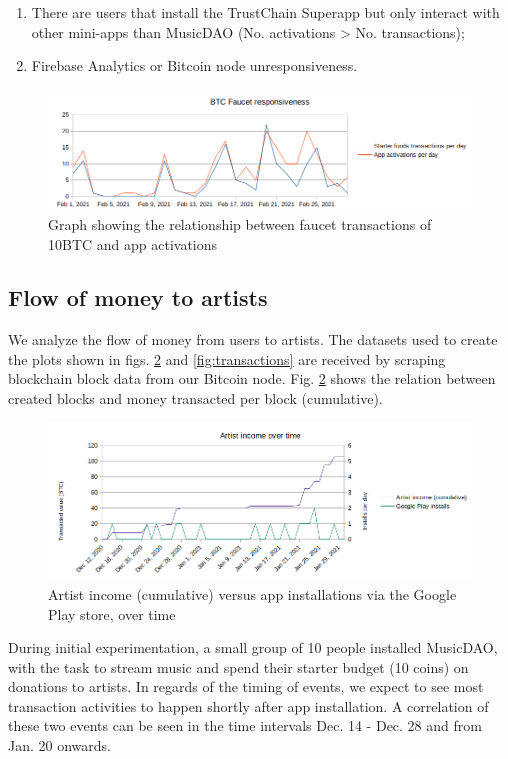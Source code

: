 \begin{enumerate}
    \item There are users that install the TrustChain Superapp but only interact with other mini-apps than MusicDAO (No. activations > No. transactions);
    \item Firebase Analytics or Bitcoin node unresponsiveness.
\end{enumerate}

\begin{figure}
    \centering
    \includegraphics[width=1\textwidth]{evaluation/faucet-app-installs-3.png}
    \caption{Graph showing the relationship between faucet transactions of 10BTC and app activations}
    \label{fig:faucet-app-installs}
\end{figure}

\subsection{Flow of money to artists}
We analyze the flow of money from users to artists. The datasets used to create the plots shown in figs. \ref{fig:artist-income} and \ref{fig:transactions} are received by scraping blockchain block data from our Bitcoin node. Fig. \ref{fig:artist-income} shows the relation between created blocks and money transacted per block (cumulative).

\begin{figure}
    \centering
    \includegraphics[width=1\textwidth]{evaluation/artist-income-3.png}
    \caption{Artist income (cumulative) versus app installations via the Google Play store, over time}
    \label{fig:artist-income}
\end{figure}
During initial experimentation, a small group of 10 people installed MusicDAO, with the task to stream music and spend their starter budget (10 coins) on donations to artists. In regards of the timing of events, we expect to see most transaction activities to happen shortly after app installation. A correlation of these two events can be seen in the time intervals Dec. 14 - Dec. 28 and from Jan. 20 onwards.

